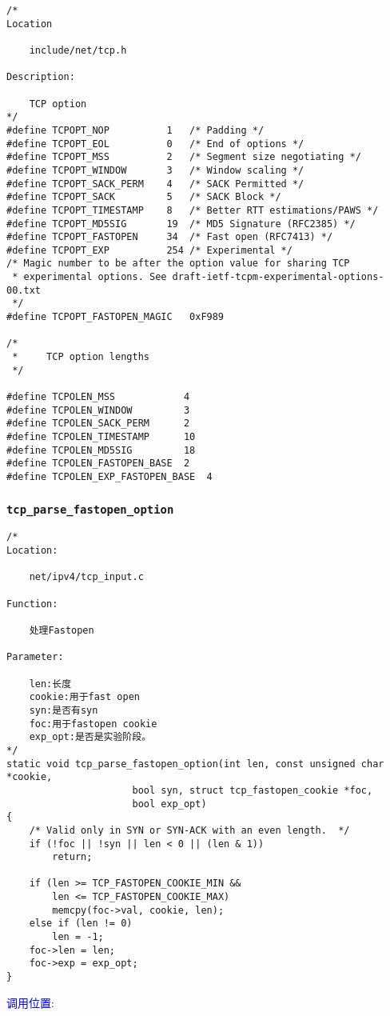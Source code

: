 \begin{verbatim}
/*
Location

	include/net/tcp.h
	
Description:
	
	TCP option
*/
#define TCPOPT_NOP			1	/* Padding */
#define TCPOPT_EOL			0	/* End of options */
#define TCPOPT_MSS			2	/* Segment size negotiating */
#define TCPOPT_WINDOW		3	/* Window scaling */
#define TCPOPT_SACK_PERM    4   /* SACK Permitted */
#define TCPOPT_SACK         5   /* SACK Block */
#define TCPOPT_TIMESTAMP	8	/* Better RTT estimations/PAWS */
#define TCPOPT_MD5SIG		19	/* MD5 Signature (RFC2385) */
#define TCPOPT_FASTOPEN		34	/* Fast open (RFC7413) */
#define TCPOPT_EXP			254	/* Experimental */
/* Magic number to be after the option value for sharing TCP
 * experimental options. See draft-ietf-tcpm-experimental-options-00.txt
 */
#define TCPOPT_FASTOPEN_MAGIC	0xF989

/*
 *     TCP option lengths
 */

#define TCPOLEN_MSS            4
#define TCPOLEN_WINDOW         3
#define TCPOLEN_SACK_PERM      2
#define TCPOLEN_TIMESTAMP      10
#define TCPOLEN_MD5SIG         18
#define TCPOLEN_FASTOPEN_BASE  2
#define TCPOLEN_EXP_FASTOPEN_BASE  4
\end{verbatim}		
		\subsubsection{\texttt{tcp_parse_fastopen_option}}
			\label{TCPOptions:tcp_parse_fastopen_option}
\begin{verbatim}
/*
Location:

	net/ipv4/tcp_input.c

Function:

	处理Fastopen

Parameter:

	len:长度
	cookie:用于fast open
	syn:是否有syn
	foc:用于fastopen cookie
	exp_opt:是否是实验阶段。
*/
static void tcp_parse_fastopen_option(int len, const unsigned char *cookie,
				      bool syn, struct tcp_fastopen_cookie *foc,
				      bool exp_opt)
{
	/* Valid only in SYN or SYN-ACK with an even length.  */
	if (!foc || !syn || len < 0 || (len & 1))
		return;

	if (len >= TCP_FASTOPEN_COOKIE_MIN &&
	    len <= TCP_FASTOPEN_COOKIE_MAX)
		memcpy(foc->val, cookie, len);
	else if (len != 0)
		len = -1;
	foc->len = len;
	foc->exp = exp_opt;
}
\end{verbatim}
		\textcolor{blue}{调用位置}:

